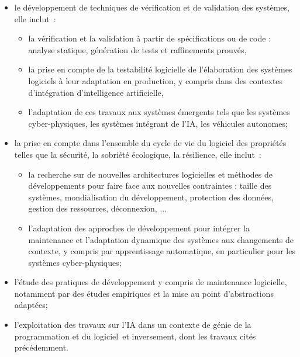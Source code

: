 \documentclass[11pt]{article}
\newcommand{\gpl}[0]{génie de la programmation et du logiciel}
\begin{document}
\begin{itemize}
\item le développement de techniques de vérification et de validation des systèmes, elle inclut~:
\begin{itemize}
\item la vérification et la validation à partir  de spécifications ou de code : analyse statique, génération de tests et raffinements prouvés,
\item la prise en compte de la testabilité logicielle de l'élaboration des systèmes logiciels à leur adaptation en production, y compris dans des contextes d'intégration d'intelligence artificielle, 
\item l'adaptation de ces travaux aux systèmes émergents tels que les systèmes cyber-physiques, les systèmes intégrant de l'IA, les véhicules autonomes;
\end{itemize}
\item la prise en compte dans l'ensemble du cycle de vie du logiciel des propriétés telles que la  sécurité, la sobriété écologique, la résilience, elle inclut~:
\begin{itemize}
\item la recherche sur de nouvelles architectures logicielles et méthodes de développements pour faire face aux nouvelles contraintes : taille des systèmes, mondialisation du développement, protection des données, gestion des ressources, déconnexion, ...
\item l'adaptation des approches de développement pour intégrer la maintenance et l'adaptation dynamique des systèmes aux changements de contexte, y compris par apprentissage automatique, en particulier pour les systèmes cyber-physiques;
\end{itemize}
\item l'étude des pratiques de développement y compris de maintenance logicielle, notamment par des études empiriques et la mise au point d'abstractions adaptées;
\item  l'exploitation des travaux sur l'IA dans un contexte de \gpl~et inversement, dont les travaux cités précédemment.

\end{itemize}
\end{document}
